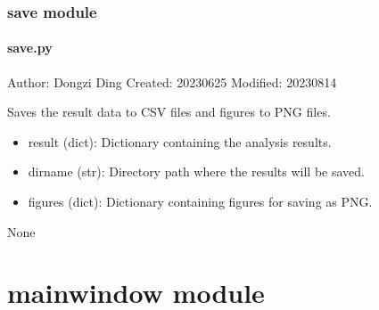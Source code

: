 \documentclass[a4paper,10pt,english]{sphinxmanual}
\begin{document}
\subsubsection{save module}
\label{\detokenize{utils:module-src.utils.save}}\label{\detokenize{utils:save-module}}

\paragraph{save.py}
\label{\detokenize{utils:save-py}}
\sphinxAtStartPar
Author: Dongzi Ding
Created: 2023\sphinxhyphen{}06\sphinxhyphen{}25
Modified: 2023\sphinxhyphen{}08\sphinxhyphen{}14

\begin{fulllineitems}
\label{\detokenize{utils:src.utils.save.save}}
\pysigstartsignatures
{}
\pysigstopsignatures
\sphinxAtStartPar
Saves the result data to CSV files and figures to PNG files.
\begin{description}
\begin{itemize}
\item {} 
\sphinxAtStartPar
result (dict): Dictionary containing the analysis results.

\item {} 
\sphinxAtStartPar
dirname (str): Directory path where the results will be saved.

\item {} 
\sphinxAtStartPar
figures (dict): Dictionary containing figures for saving as PNG.

\end{itemize}

\sphinxAtStartPar
None

\end{description}

\end{fulllineitems}



\section{mainwindow module}
\label{\detokenize{src:module-src.mainwindow}}\label{\detokenize{src:mainwindow-module}}
\end{document}
